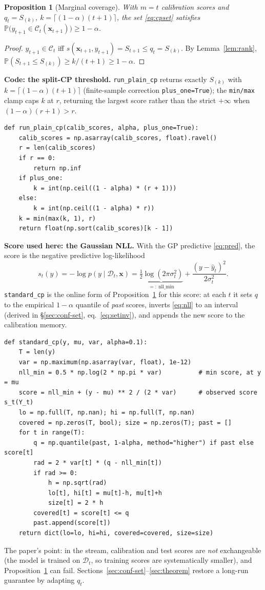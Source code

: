 \documentclass[11pt]{article}
\theoremstyle{plain}
\newtheorem{proposition}{Proposition}
\theoremstyle{definition}
\newcommand{\Prob}{\mathbb{P}}
\newcommand{\D}{\mathcal{D}}
\newcommand{\C}{\mathcal{C}}
\newcommand{\x}{\mathbf{x}}
\newcommand{\hy}{\hat{y}}
\newcommand{\code}[1]{\texttt{#1}}
\begin{document}
\begin{proposition}[Marginal coverage]\label{prop:cov}
With $m=t$ calibration scores and $q_t=S_{(k)}$, $k=\lceil(1-\alpha)(t+1)\rceil$, the set \eqref{eq:cpset} satisfies $\Prob\big(y_{t+1}\in\C_t(\x_{t+1})\big)\ge1-\alpha$.
\end{proposition}
\begin{proof}
$y_{t+1}\in\C_t$ iff $s(\x_{t+1},y_{t+1})=S_{t+1}\le q_t=S_{(k)}$. By Lemma~\ref{lem:rank}, $\Prob(S_{t+1}\le S_{(k)})\ge k/(t+1)\ge1-\alpha$.
\end{proof}

\noindent\textbf{Code: the split-CP threshold.} \code{run\_plain\_cp} returns exactly $S_{(k)}$ with $k=\lceil(1-\alpha)(t+1)\rceil$ (finite-sample correction \code{plus\_one=True}); the \code{min/max} clamp caps $k$ at $r$, returning the largest score rather than the strict $+\infty$ when $(1-\alpha)(r+1)>r$.
\begin{lstlisting}
def run_plain_cp(calib_scores, alpha, plus_one=True):
    calib_scores = np.asarray(calib_scores, float).ravel()
    r = len(calib_scores)
    if r == 0:
        return np.inf
    if plus_one:
        k = int(np.ceil((1 - alpha) * (r + 1)))
    else:
        k = int(np.ceil((1 - alpha) * r))
    k = min(max(k, 1), r)
    return float(np.sort(calib_scores)[k - 1])
\end{lstlisting}

\noindent\textbf{Score used here: the Gaussian NLL.} With the GP predictive \eqref{eq:pred}, the score is the negative predictive log-likelihood
\begin{equation}
s_t(y)=-\log p(y\mid\D_t,\x)=\underbrace{\tfrac12\log(2\pi\sigma_t^2)}_{=:~\text{nll\_min}}+\frac{(y-\hy_t)^2}{2\sigma_t^2}.
\label{eq:nll}
\end{equation}
\code{standard\_cp} is the online form of Proposition~\ref{prop:cov} for this score: at each $t$ it sets $q$ to the empirical $1-\alpha$ quantile of \emph{past} scores, inverts \eqref{eq:nll} to an interval (derived in \S\ref{sec:conf-set}, eq.~\eqref{eq:setinv}), and appends the new score to the calibration memory.
\begin{lstlisting}
def standard_cp(y, mu, var, alpha=0.1):
    T = len(y)
    var = np.maximum(np.asarray(var, float), 1e-12)
    nll_min = 0.5 * np.log(2 * np.pi * var)          # min score, at y = mu
    score = nll_min + (y - mu) ** 2 / (2 * var)      # observed score s_t(Y_t)
    lo = np.full(T, np.nan); hi = np.full(T, np.nan)
    covered = np.zeros(T, bool); size = np.zeros(T); past = []
    for t in range(T):
        q = np.quantile(past, 1-alpha, method="higher") if past else score[t]
        rad = 2 * var[t] * (q - nll_min[t])
        if rad >= 0:
            h = np.sqrt(rad)
            lo[t], hi[t] = mu[t]-h, mu[t]+h
            size[t] = 2 * h
        covered[t] = score[t] <= q
        past.append(score[t])
    return dict(lo=lo, hi=hi, covered=covered, size=size)
\end{lstlisting}
The paper's point: in the stream, calibration and test scores are \emph{not} exchangeable (the model is trained on $\D_t$, so training scores are systematically smaller), and Proposition~\ref{prop:cov} can fail. Sections~\ref{sec:conf-set}--\ref{sec:theorem} restore a long-run guarantee by adapting $q_t$.
\end{document}
